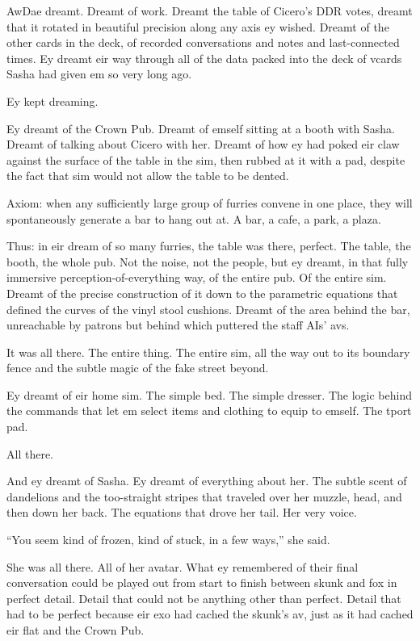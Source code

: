AwDae dreamt. Dreamt of work. Dreamt the table of Cicero's DDR votes, dreamt that it rotated in beautiful precision along any axis ey wished. Dreamt of the other cards in the deck, of recorded conversations and notes and last-connected times. Ey dreamt eir way through all of the data packed into the deck of vcards Sasha had given em so very long ago.

Ey kept dreaming.

Ey dreamt of the Crown Pub. Dreamt of emself sitting at a booth with Sasha. Dreamt of talking about Cicero with her. Dreamt of how ey had poked eir claw against the surface of the table in the sim, then rubbed at it with a pad, despite the fact that sim would not allow the table to be dented.

Axiom: when any sufficiently large group of furries convene in one place, they will spontaneously generate a bar to hang out at. A bar, a cafe, a park, a plaza.

Thus: in eir dream of so many furries, the table was there, perfect. The table, the booth, the whole pub. Not the noise, not the people, but ey dreamt, in that fully immersive perception-of-everything way, of the entire pub. Of the entire sim. Dreamt of the precise construction of it down to the parametric equations that defined the curves of the vinyl stool cushions. Dreamt of the area behind the bar, unreachable by patrons but behind which puttered the staff AIs' avs.

It was all there. The entire thing. The entire sim, all the way out to its boundary fence and the subtle magic of the fake street beyond.

Ey dreamt of eir home sim. The simple bed. The simple dresser. The logic behind the commands that let em select items and clothing to equip to emself. The tport pad.

All there.

And ey dreamt of Sasha. Ey dreamt of everything about her. The subtle scent of dandelions and the too-straight stripes that traveled over her muzzle, head, and then down her back. The equations that drove her tail. Her very voice.

``You seem kind of frozen, kind of stuck, in a few ways,'' she said.

She was all there. All of her avatar. What ey remembered of their final conversation could be played out from start to finish between skunk and fox in perfect detail. Detail that could not be anything other than perfect. Detail that had to be perfect because eir exo had cached the skunk's av, just as it had cached eir flat and the Crown Pub.

